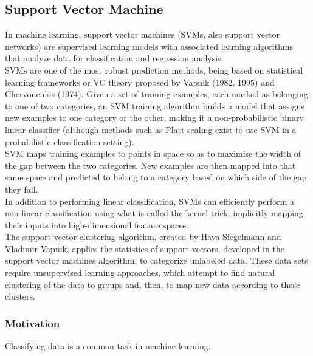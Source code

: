 \subsection{\textbf{Support Vector Machine}}
\cite{SVM}
In machine learning, support vector machines (SVMs, also support vector networks) are supervised learning models with associated learning algorithms that analyze data for classification and regression analysis. 
\\

SVMs are one of the most robust prediction methods, being based on statistical learning frameworks or VC theory proposed by Vapnik (1982, 1995) and Chervonenkis (1974). Given a set of training examples, each marked as belonging to one of two categories, an SVM training algorithm builds a model that assigns new examples to one category or the other, making it a non-probabilistic binary linear classifier (although methods such as Platt scaling exist to use SVM in a probabilistic classification setting). \\

SVM maps training examples to points in space so as to maximise the width of the gap between the two categories. New examples are then mapped into that same space and predicted to belong to a category based on which side of the gap they fall.
\\

In addition to performing linear classification, SVMs can efficiently perform a non-linear classification using what is called the kernel trick, implicitly mapping their inputs into high-dimensional feature spaces.
\\

The support vector clustering algorithm, created by Hava Siegelmann and Vladimir Vapnik, applies the statistics of support vectors, developed in the support vector machines algorithm, to categorize unlabeled data. These data sets require unsupervised learning approaches, which attempt to find natural clustering of the data to groups and, then, to map new data according to these clusters.\\

\subsubsection{\textbf{Motivation}}
Classifying data is a common task in machine learning.
\\

